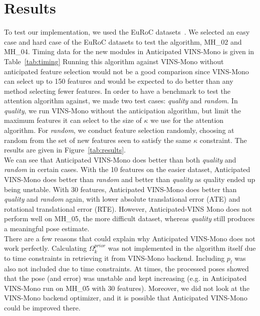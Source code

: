 
\section{Results}\label{sec:results}

To test our implementation, we used the EuRoC datasets~\cite{Burri2016}. We selected an easy case and hard case of the EuRoC datasets to test the algorithm, MH\_02 and MH\_04. Timing data for the new modules in Anticipated VINS-Mono is given in Table~\ref{tab:timing} Running this algorithm against VINS-Mono without anticipated feature selection would not be a good comparison since VINS-Mono can select up to 150 features and would be expected to do better than any method selecting fewer features. In order to have a benchmark to test the attention algorithm against, we made two test cases: \textit{quality} and \textit{random}. In \textit{quality}, we run VINS-Mono without the anticipation algorithm, but limit the maximum features it can select to the size of $\kappa$ we use for the attention algorithm. For \textit{random}, we conduct feature selection randomly, choosing at random from the set of new features seen to satisfy the same $\kappa$ constraint. The results are given in Figure~\ref{tab:results}. \\
We can see that Anticipated VINS-Mono does better than both \textit{quality} and \textit{random} in certain cases. With the 10 features on the easier dataset, Anticipated VINS-Mono does better than \textit{random} and better than \textit{quality} as quality ended up being unstable. With 30 features, Anticipated VINS-Mono does better than \textit{quality} and \textit{random} again, with lower absolute translational error (ATE) and rotational translational error (RTE). However, Anticipated-VINS Mono does not perform well on MH\_05, the more difficult dataset, whereas \textit{quality} still produces a meaningful pose estimate.
\\
There are a few reasons that could explain why Anticipated VINS-Mono does not work perfectly. Calculating $\Omega_k^{prior}$ was not implemented in the algorithm itself due to time constraints in retrieving it from VINS-Mono backend. Including $p_l$ was also not included due to time constraints. At times, the processed poses showed that the pose (and error) was unstable and kept increasing (e.g. in Anticipated VINS-Mono run on MH\_05 with 30 features). Moreover, we did not look at the VINS-Mono backend optimizer, and it is possible that Anticipated VINS-Mono could be improved there.

